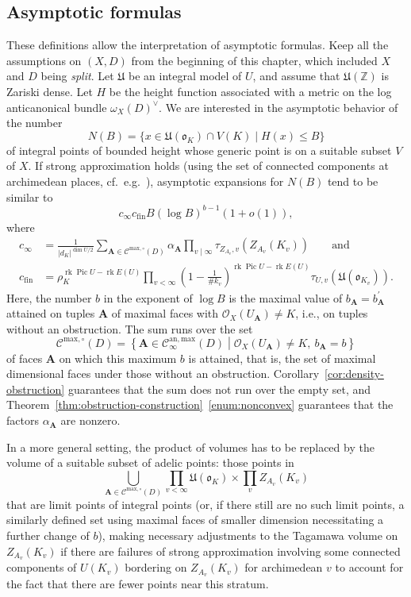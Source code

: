 \documentclass[a4paper, twoside, 10pt]{amsart}
\newcommand{\uA}{{\boldsymbol{A}}}
\newcommand{\cC}{\mathcal{C}}
\newcommand{\cO}{\mathcal{O}}
\newcommand{\mU}{\mathfrak{U}}
\newcommand{\fo}{\mathfrak{o}}
\newcommand{\ZZ}{\mathbb{Z}}
\newcommand{\Canmax}{\cC^{\mathrm{an,max}}}
\DeclareMathOperator{\Pic}{Pic}
\DeclareMathOperator{\rk}{rk}
\newcommand{\abs}[1]{\left\lvert#1\right\rvert}
\newcommand{\relmiddle}[1]{\mathrel{}\middle#1\mathrel{}}
\newcommand{\fin}{\mathrm{fin}}
\newcommand{\tmax}{\mathrm{max}}
\theoremstyle{definition}
\begin{document}
\subsection{Asymptotic formulas}\label{ssec:asymptotic-formulas}
These definitions allow the interpretation of asymptotic formulas. Keep all the assumptions on $(X,D)$ from the beginning of this chapter, which included $X$ and $D$ being \emph{split}. Let $\mU$ be an integral model of $U$, and assume that $\mU(\ZZ)$ is Zariski dense. Let $H$ be the height function associated with a metric on the log anticanonical bundle $\omega_X(D)^\vee$. We are interested in the asymptotic behavior of the number
\[
  N(B)=\{x\in\mU(\fo_K)\cap V(K) \mid H(x) \le B\}
\]
of integral points of bounded height whose generic point is on a suitable subset $V$ of $X$. If strong approximation holds (using the set of connected components at archimedean places, cf.\ e.g.\ \cite{MR4288633}), asymptotic expansions for $N(B)$ tend to be similar to
\begin{equation}\label{eq:asymptotic-formulas}
  c_\infty c_{\fin} B (\log B)^{b-1}(1+o(1)),
\end{equation}
where
\begin{align*}
  c_\infty &= \frac{1}{\abs{d_K}^{\dim U/2}}
  \sum_{
    \uA\in\cC^{\tmax,\circ}(D)
  }
  \alpha_\uA \prod_{v\mid\infty}
  \tau_{Z_{A_v},v} \left(Z_{A_v}(K_v)\right) \qquad \text{and}
  \\
  c_{\fin} &=
  \rho_K^{\rk\Pic U - \rk E(U)}
  \prod_{v<\infty}
  \left(1-\frac{1}{\#k_v}\right)^{\rk\Pic U - \rk E(U)}
  \tau_{U,v}(\mU(\fo_{K_v})).
\end{align*}
Here, the number $b$ in the exponent of $\log B$ is the maximal value of $b_\uA=b_\uA^\prime$ attained on tuples $\uA$ of maximal faces with $\cO_X(U_\uA)\ne K$, i.e., on tuples without an obstruction. The sum runs over the set
\[
  \cC^{\tmax,\circ}(D) = \left\{\uA \in \Canmax_\infty(D) \relmiddle| \cO_X(U_\uA)\ne K,\ b_\uA=b \right\}
\]
of faces $\uA$ on which this maximum $b$ is attained, that is, the set of maximal dimensional faces under those without an obstruction. Corollary~\ref{cor:density-obstruction} guarantees that the sum does not run over the empty set, and Theorem~\ref{thm:obstruction-construction}~\eqref{enum:nonconvex} guarantees that the factors $\alpha_\uA$ are nonzero.

In a more general setting,
the product of volumes has to be replaced by the volume of a suitable subset of adelic points: those points in
\[
  \bigcup_{\uA \in \cC^{\tmax,\circ}(D)}
  \prod_{v<\infty}\mU(\fo_K) \times \prod_v Z_{A_v}(K_v)
\]
that are limit points of integral points (or, if there still are no such limit points, a similarly defined set using maximal faces of smaller dimension necessitating a further change of $b$), making necessary adjustments to the Tagamawa volume on $Z_{A_v}(K_v)$ if there are failures of strong approximation involving some connected components of $U(K_v)$ bordering on $Z_{A_v}(K_v)$ for archimedean $v$ to account for the fact that there are fewer points near this stratum.
\end{document}
